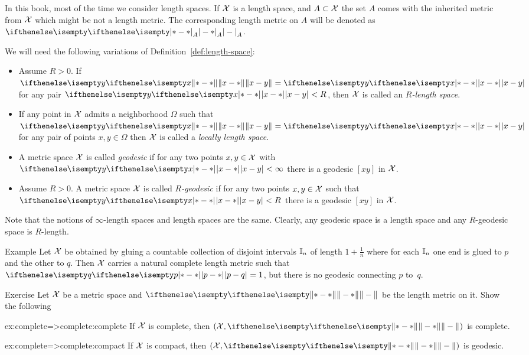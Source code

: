 In this book, most of the time we consider length spaces.
If $\mathcal{X}$ is a length space, 
and $A\subset \spc{X}$ the set $A$ comes with the inherited metric from $\mathcal{X}$ 
which might be not a length metric.
The corresponding length metric on $A$ will be denoted as $\dist{}{}{A}$.


We will need the following variations of Definition~\ref{def:length-space}:

\begin{itemize}
\item Assume $R>0$.
If $\yetdist{x}{y}{}=\dist{x}{y}{}$ for any pair $\dist{x}{y}{}<R$, then $\mathcal{X}$ is called an \emph{$R$-length space}.
\item If any point in $\mathcal{X}$ admits a neighborhood  $\Omega$ such that $\yetdist{x}{y}{}=\dist{x}{y}{}$ for any pair of points $x,y\in \Omega$
then  $\mathcal{X}$ is called a \emph{locally length space}.
\item A metric space $\mathcal{X}$ is called 
\emph{geodesic}
if for any two points $x,y\in \spc{X}$ with $\dist{x}{y}{}<\infty$ there is a geodesic $[x y]$ in $\mathcal{X}$.
\item Assume $R>0$. A metric space $\mathcal{X}$ is called 
\emph{$R$-geodesic}
if for any two points $x,y\in \spc{X}$ such that $\dist{x}{y}{}<R$ there is a geodesic $[x y]$ in $\mathcal{X}$.
\end{itemize}

Note that the notions of $\infty$-length spaces and length spaces are the same.
Clearly, any geodesic space is a length space 
and any $R$-geodesic space is $R$-length.

\begin{thm}{Example} 
Let $\mathcal{X}$ be obtained by gluing a countable collection of disjoint intervals $\mathbb{I}_n$ of length $1+\tfrac1n$ where for each $\mathbb{I}_n$ one end is glued to $p$ and the other to $q$.
Then $\mathcal{X}$ carries a natural complete length metric such that $\dist{p}{q}{}=1$, but there is no geodesic connecting $p$ to~$q$.
\end{thm}

\begin{thm}{Exercise}\label{ex:complete=>complete}
Let $\mathcal{X}$ be a metric space
and $\yetdist{}{}{}$ be the length metric on it.
Show the following
\begin{subthm}{ex:complete=>complete:complete}
If $\mathcal{X}$  is complete, then  $(\spc{X},\yetdist{}{}{})$ is complete.
\end{subthm}

\begin{subthm}{ex:complete=>complete:compact}
If $\mathcal{X}$ is compact, then $(\spc{X},\yetdist{}{}{})$ is geodesic.
\end{subthm}
\end{thm}


